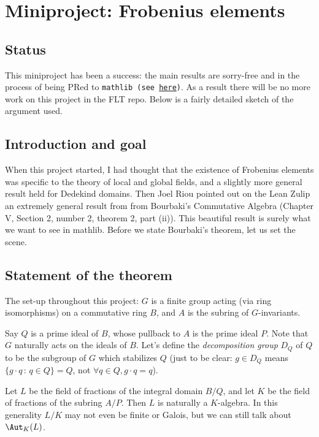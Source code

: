 \chapter{Miniproject: Frobenius elements}\label{Frobenius_project}

\section{Status}

This miniproject has been a success: the main results
are sorry-free and in the process of being PRed to
{\tt mathlib (see \href{https://github.com/leanprover-community/mathlib4/pull/17717}{here})}.
As a result there will be no more work
on this project in the FLT repo. Below is a fairly
detailed sketch of the argument used.

\section{Introduction and goal}

When this project started, I had thought that the existence of Frobenius elements was
specific to the theory of local and global fields, and a slightly more general result
held for Dedekind domains. Then Joel Riou pointed out on the Lean Zulip
an extremely general result from from Bourbaki's Commutative Algebra
(Chapter V, Section 2, number 2, theorem 2, part (ii)). This beautiful
result is surely what we want to see in mathlib. Before we state Bourbaki's
theorem, let us set the scene.

\section{Statement of the theorem}

The set-up throughout this project:
$G$ is a finite group acting (via ring isomorphisms) on a commutative ring $B$,
and $A$ is the subring of $G$-invariants.

Say $Q$ is a prime ideal of $B$, whose pullback to $A$ is the prime ideal $P$.
Note that $G$ naturally acts on the ideals of $B$. Let's define the
\emph{decomposition group} $D_Q$ of $Q$ to be the subgroup of $G$ which
stabilizes $Q$ (just to be clear: $g\in D_Q$ means
$\{g\cdot q\, :\, q \in Q\}=Q$, not $\forall q\in Q, g\cdot q=q$).

Let $L$ be the field of fractions of the integral domain $B/Q$, and let $K$ be the
field of fractions of the subring $A/P$. Then $L$ is naturally a $K$-algebra.
In this generality $L/K$ may not even be finite or Galois, but we can still talk about
$\Aut_K(L)$.

